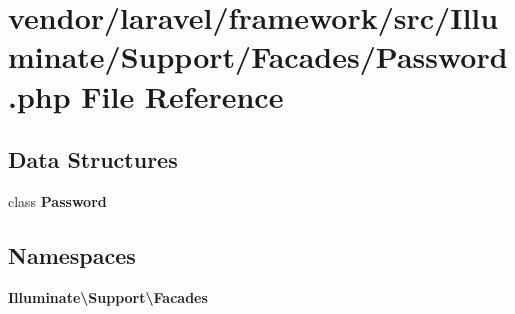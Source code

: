 \section{vendor/laravel/framework/src/\+Illuminate/\+Support/\+Facades/\+Password.php File Reference}
\label{laravel_2framework_2src_2_illuminate_2_support_2_facades_2password_8php}
\subsection*{Data Structures}
\begin{DoxyCompactItemize}
\item 
class {\bf Password}
\end{DoxyCompactItemize}
\subsection*{Namespaces}
\begin{DoxyCompactItemize}
\item 
 {\bf Illuminate\textbackslash{}\+Support\textbackslash{}\+Facades}
\end{DoxyCompactItemize}
